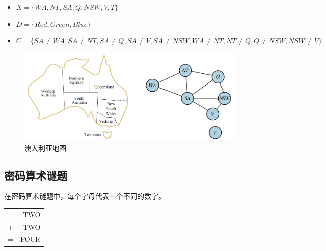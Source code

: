 \begin{itemize}
    \item $ X = \{WA, NT, SA, Q, NSW, V, T\} $
    \item $ D = \{Red, Green, Blue\} $
    \item $ C = \{SA \neq WA, SA \neq NT, SA \neq Q, SA \neq V, SA \neq NSW, WA \neq NT, NT \neq Q, Q \neq NSW, NSW \neq V\} $
\end{itemize}

\begin{figure}[H]
    \centering
    \includegraphics[scale=0.45]{img/C2/2-1/1.png}
    \caption{澳大利亚地图}
\end{figure}

\vspace{0.5cm}

\subsection{密码算术谜题}

在密码算术谜题中，每个字母代表一个不同的数字。

\begin{table}[H]
    \centering
    \begin{tabular}{cD{.}{.}{3}}
          & TWO  \\
        + & TWO  \\
        \hline
        = & FOUR
    \end{tabular}
\end{table}

